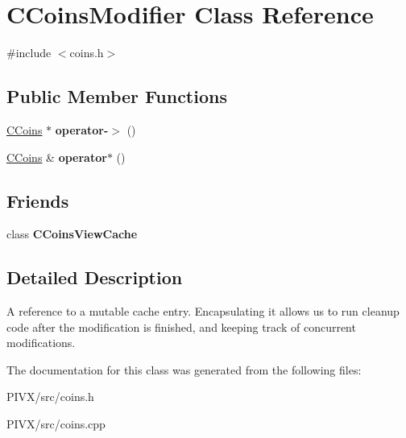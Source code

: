 \hypertarget{class_c_coins_modifier}{}\section{C\+Coins\+Modifier Class Reference}
\label{class_c_coins_modifier}


{\ttfamily \#include $<$coins.\+h$>$}

\subsection*{Public Member Functions}
\begin{DoxyCompactItemize}
\item 
\mbox{\label{class_c_coins_modifier_a5831f586921460e6ec26635cb92c12f6}} 
\mbox{\hyperlink{class_c_coins}{C\+Coins}} $\ast$ {\bfseries operator-\/$>$} ()
\item 
\mbox{\label{class_c_coins_modifier_a403cd7eb708f8c744598ad890bcce1b5}} 
\mbox{\hyperlink{class_c_coins}{C\+Coins}} \& {\bfseries operator$\ast$} ()
\end{DoxyCompactItemize}
\subsection*{Friends}
\begin{DoxyCompactItemize}
\item 
\mbox{\label{class_c_coins_modifier_a1a8530a17e2e3f56e97217784400ee46}} 
class {\bfseries C\+Coins\+View\+Cache}
\end{DoxyCompactItemize}


\subsection{Detailed Description}
A reference to a mutable cache entry. Encapsulating it allows us to run cleanup code after the modification is finished, and keeping track of concurrent modifications. 

The documentation for this class was generated from the following files\+:\begin{DoxyCompactItemize}
\item 
P\+I\+V\+X/src/coins.\+h\item 
P\+I\+V\+X/src/coins.\+cpp\end{DoxyCompactItemize}
